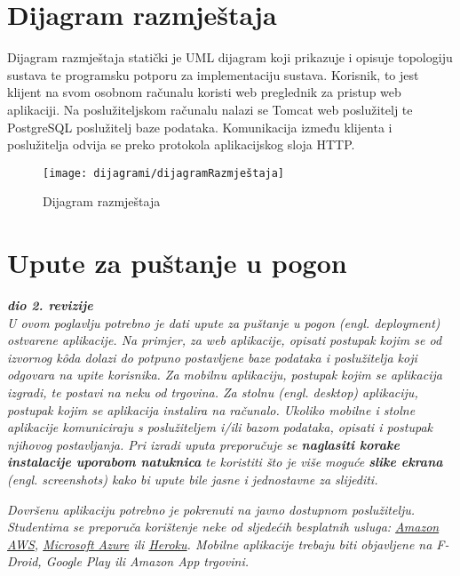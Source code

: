 			\eject 
		
		
		\section{Dijagram razmještaja}
		
			Dijagram razmještaja statički je UML dijagram koji prikazuje i opisuje topologiju sustava te programsku potporu za implementaciju sustava. Korisnik, to jest klijent na svom osobnom računalu koristi web preglednik za pristup web aplikaciji. Na poslužiteljskom računalu nalazi se Tomcat web poslužitelj te PostgreSQL poslužitelj baze podataka. Komunikacija između klijenta i poslužitelja odvija se preko protokola aplikacijskog sloja HTTP.
			
			\begin{figure}[H]
				\texttt{[image: dijagrami/dijagramRazmještaja]} %
				\centering
				\caption{Dijagram razmještaja}
				\label{fig:dijagramRazmjestaja}
			\end{figure}
			
			 
			\eject 
		
		\section{Upute za puštanje u pogon}
		
			\textbf{\textit{dio 2. revizije}}\\
		
			 \textit{U ovom poglavlju potrebno je dati upute za puštanje u pogon (engl. deployment) ostvarene aplikacije. Na primjer, za web aplikacije, opisati postupak kojim se od izvornog kôda dolazi do potpuno postavljene baze podataka i poslužitelja koji odgovara na upite korisnika. Za mobilnu aplikaciju, postupak kojim se aplikacija izgradi, te postavi na neku od trgovina. Za stolnu (engl. desktop) aplikaciju, postupak kojim se aplikacija instalira na računalo. Ukoliko mobilne i stolne aplikacije komuniciraju s poslužiteljem i/ili bazom podataka, opisati i postupak njihovog postavljanja. Pri izradi uputa preporučuje se \textbf{naglasiti korake instalacije uporabom natuknica} te koristiti što je više moguće \textbf{slike ekrana} (engl. screenshots) kako bi upute bile jasne i jednostavne za slijediti.}
			
			
			 \textit{Dovršenu aplikaciju potrebno je pokrenuti na javno dostupnom poslužitelju. Studentima se preporuča korištenje neke od sljedećih besplatnih usluga: \href{https://aws.amazon.com/}{Amazon AWS}, \href{https://azure.microsoft.com/en-us/}{Microsoft Azure} ili \href{https://www.heroku.com/}{Heroku}. Mobilne aplikacije trebaju biti objavljene na F-Droid, Google Play ili Amazon App trgovini.}
			
			
			\eject 
